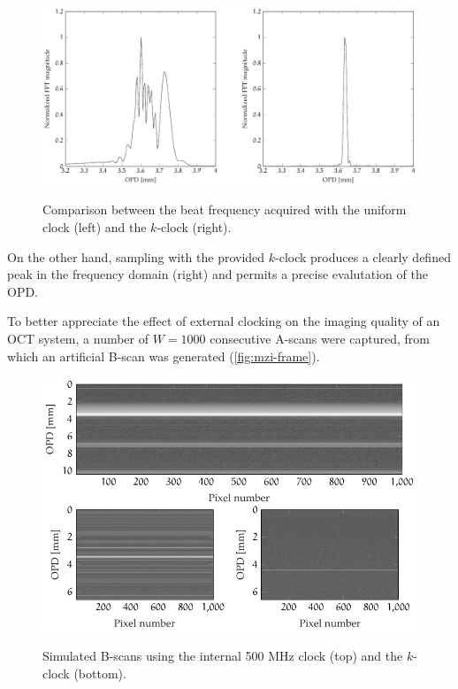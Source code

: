 \begin{figure}[hbt]
	{\myfloatalign
		\includegraphics[width=\linewidth]{gfx/ch3/interferometer/interferometer}}
	\caption{Comparison between the beat frequency acquired with the uniform clock (left) and the $k$-clock (right).}\label{fig:mzi-comparison}
\end{figure}

On the other hand, sampling with the provided $k$-clock produces a clearly defined peak in the frequency domain (right) and permits a precise evalutation of the OPD. 

To better appreciate the effect of external clocking on the imaging quality of an OCT system, a number of $W = 1000$ consecutive A-scans were captured, from which an artificial B-scan was generated (\autoref{fig:mzi-frame}). 


\begin{figure}[hbt]
	{\myfloatalign
		\includegraphics[width=\linewidth]{gfx/ch3/interferometer/interferometer-frame}}
	\caption{Simulated B-scans using the internal 500 MHz clock (top) and the $k$-clock (bottom).}\label{fig:mzi-frame}
\end{figure}

